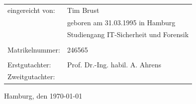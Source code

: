 \begin{titlepage}
            \begin{tabular}{p{5cm}l}
                eingereicht von:    & Tim Brust\\
                                    & geboren am 31.03.1995 in Hamburg\\
                                    & Studiengang IT-Sicherheit und Forensik\\
                                    	& \\
                Matrikelnummer:     & 246565\\
                                    & \\
                Erstgutachter:      & Prof. Dr.-Ing. habil. A. Ahrens\\
                Zweitgutachter:		& 
            \end{tabular}

    \vspace{1.25cm}
    Hamburg, den \today
\end{titlepage}
